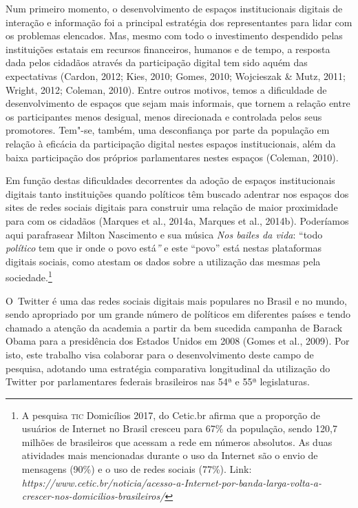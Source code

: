 Num primeiro momento, o desenvolvimento de espaços institucionais
digitais de interação e informação foi a principal estratégia dos
representantes para lidar com os problemas elencados. Mas, mesmo com
todo o investimento despendido pelas instituições estatais em recursos
financeiros, humanos e de tempo, a resposta dada pelos cidadãos através
da participação digital tem sido aquém das expectativas (Cardon, 2012;
Kies, 2010; Gomes, 2010; Wojcieszak \& Mutz, 2011; Wright, 2012;
Coleman, 2010). Entre outros motivos, temos a dificuldade de
desenvolvimento de espaços que sejam mais informais, que tornem a
relação entre os participantes menos desigual, menos direcionada e
controlada pelos seus promotores. Tem"-se, também, uma desconfiança por
parte da população em relação à eficácia da participação digital nestes
espaços institucionais, além da baixa participação dos próprios
parlamentares nestes espaços (Coleman, 2010).

Em função destas dificuldades decorrentes da adoção de espaços
institucionais digitais tanto instituições quando políticos têm buscado
adentrar nos espaços dos sites de redes sociais digitais para construir
uma relação de maior proximidade para com os cidadãos (Marques et al.,
2014a, Marques et al., 2014b). Poderíamos aqui parafrasear Milton
Nascimento e sua música \emph{Nos bailes da vida}: ``todo
\emph{político} tem que ir onde o povo está\emph{''} e este ``povo''
está nestas plataformas digitais sociais, como atestam os dados sobre a
utilização das mesmas pela sociedade.\footnote{A pesquisa \textsc{tic} Domicílios
  2017, do Cetic.br afirma que a proporção de usuários de Internet no
  Brasil cresceu para 67\% da população, sendo 120,7 milhões de
  brasileiros que acessam a rede em números absolutos. As duas
  atividades mais mencionadas durante o uso da Internet são o envio de
  mensagens (90\%) e o uso de redes sociais (77\%). Link:
  \emph{https://www.cetic.br/noticia/acesso-a-Internet-por-banda-larga-volta-a-crescer-nos-domicilios-brasileiros/}}

O~Twitter é uma das redes sociais digitais mais populares no Brasil e no
mundo, sendo apropriado por um grande número de políticos em diferentes
países e tendo chamado a atenção da academia a partir da bem sucedida
campanha de Barack Obama para a presidência dos Estados Unidos em 2008
(Gomes et al., 2009). Por isto, este trabalho visa colaborar para o
desenvolvimento deste campo de pesquisa, adotando uma estratégia
comparativa longitudinal da utilização do Twitter por parlamentares
federais brasileiros nas 54ª e 55ª legislaturas.

